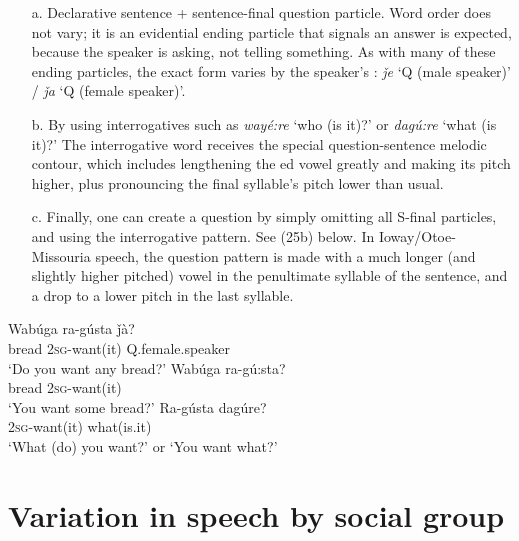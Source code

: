 \documentclass[output=paper]{LSP/langsci}
\begin{document}
\begin{itemize}
\item[a.] Declarative sentence + sentence-final question particle. Word order does not vary; it is an evidential ending particle that signals an answer is expected, because the speaker is asking, not telling something.  As with many of these ending particles, the exact form varies by the speaker's : \textit{\v{j}e} `Q (male speaker)' / \textit{\v{j}a} `Q (female speaker)'. 

\item[b.]  By using interrogatives such as \textit{wayé:re} `who (is it)?' or \textit{dagú:re} `what (is it)?' The interrogative word receives the special question-sentence melodic contour, which includes lengthening the ed vowel greatly and making its pitch higher, plus pronouncing the final syllable's pitch lower than usual.  	

\item[c.]  Finally, one can create a question by simply omitting all S-final particles, and using the interrogative  pattern. See (25b) below.  In Ioway/Otoe-Missouria speech, the question pattern is made with a much longer (and slightly higher pitched) vowel in the penultimate syllable of the sentence, and a drop to a lower pitch in the last syllable.	
\end{itemize}
\begin{exe}
\ex
\begin{xlist}	       		          	     
\ex \gll Wabúga ra-gústa       \v{j}à?  \\						 	      		
bread       2\textsc{sg}-want(it) Q.female.speaker \\					     		
\trans `Do you want any bread?' 
\ex \gll Wabúga ra-gú:sta? \\					 	 	         		
bread        2\textsc{sg}-want(it) \\			     	     		
\trans `You want some bread?'	
\ex \gll Ra-gústa    dagúre?  \\							        		
2\textsc{sg}-want(it) what(is.it) \\				                    		 	
\trans `What (do) you want?' or `You want what?'
\end{xlist}
\end{exe}

\section{Variation in speech by social group}
\end{document}
